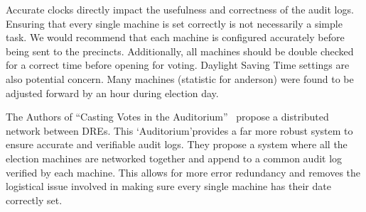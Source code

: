 Accurate clocks directly impact the usefulness and correctness of the audit logs. Ensuring that every single machine is set correctly is not necessarily a simple task.  We would recommend that each machine is configured accurately before being sent to the precincts.  Additionally, all machines should be double checked for a correct time before opening for voting.  Daylight Saving Time settings are also potential concern.  Many machines (statistic for anderson) were found to be adjusted forward by an hour during election day.  

The Authors of \textquotedblleft Casting Votes in the Auditorium\textquotedblright~\cite{Sandler2007} propose a distributed network between DREs.  This \textquoteleft Auditorium\textquoteright provides a far more robust system to ensure accurate and verifiable audit logs.  They propose a system where all the election machines are networked together and append to a common audit log verified by each machine.  This allows for more error redundancy and removes the logistical issue involved in making sure every single machine has their date correctly set.
